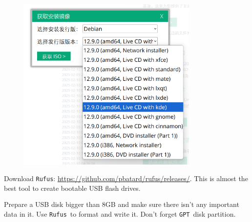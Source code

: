 \documentclass[12pt]{ctexart}
\begin{document}
\begin{figure}[H]
    \centering
    \includegraphics[width=0.8\textwidth,keepaspectratio]{assets/Linux/3.1 Seek common ground while reserving differences/4.png}
\end{figure}

Download \texttt{Rufus}:
\url{https://github.com/pbatard/rufus/releases/}. This is almost the
best tool to create bootable USB flash drives.

Prepare a USB disk bigger than 8GB and make sure there
isn't any important data in it. Use \texttt{Rufus}\ to
format and write it. Don't forget \texttt{GPT}\ disk
partition.
\end{document}

